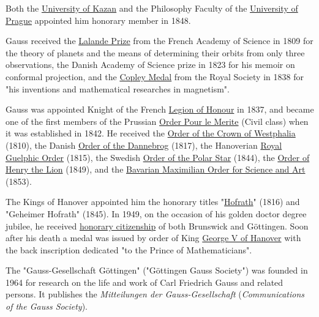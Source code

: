 Both the \href{https://en.wikipedia.org/wiki/University_of_Kazan}{University of Kazan} and the Philosophy Faculty of the \href{https://en.wikipedia.org/wiki/Charles_University}{University of Prague} appointed him honorary member in 1848.

Gauss received the \href{https://en.wikipedia.org/wiki/Lalande_Prize}{Lalande Prize} from the French Academy of Science in 1809 for the theory of planets and the means of determining their orbits from only three observations, the Danish Academy of Science prize in 1823 for his memoir on conformal projection, and the \href{https://en.wikipedia.org/wiki/Copley_Medal}{Copley Medal} from the Royal Society in 1838 for "his inventions and mathematical researches in magnetism".

Gauss was appointed Knight of the French \href{https://en.wikipedia.org/wiki/Legion_of_Honour}{Legion of Honour} in 1837, and became one of the first members of the Prussian \href{https://en.wikipedia.org/wiki/Order_Pour_le_Merite\#Civil_class}{Order Pour le Merite} (Civil class) when it was established in 1842. He received the \href{https://en.wikipedia.org/wiki/Order_of_the_Crown_of_Westphalia}{Order of the Crown of Westphalia} (1810), the Danish \href{https://en.wikipedia.org/wiki/Order_of_the_Dannebrog}{Order of the Dannebrog} (1817), the Hanoverian \href{https://en.wikipedia.org/wiki/Royal_Guelphic_Order}{Royal Guelphic Order} (1815), the Swedish \href{https://en.wikipedia.org/wiki/Order_of_the_Polar_Star}{Order of the Polar Star} (1844), the \href{https://en.wikipedia.org/wiki/Order_of_Henry_the_Lion}{Order of Henry the Lion} (1849), and the \href{https://en.wikipedia.org/wiki/Bavarian_Maximilian_Order_for_Science_and_Art}{Bavarian Maximilian Order for Science and Art} (1853).

The Kings of Hanover appointed him the honorary titles "\href{https://en.wikipedia.org/wiki/Hofrath}{Hofrath}" (1816) and "Geheimer Hofrath" (1845). In 1949, on the occasion of his golden doctor degree jubilee, he received \href{https://en.wikipedia.org/wiki/Honorary_citizenship}{honorary citizenship} of both Brunswick and Göttingen. Soon after his death a medal was issued by order of King \href{https://en.wikipedia.org/wiki/George_V_of_Hanover}{George V of Hanover} with the back inscription dedicated "to the Prince of Mathematicians".

The "Gauss-Gesellschaft Göttingen" ("Göttingen Gauss Society") was founded in 1964 for research on the life and work of Carl Friedrich Gauss and related persons. It publishes the \emph{Mitteilungen der Gauss-Gesellschaft} (\emph{Communications of the Gauss Society}).



